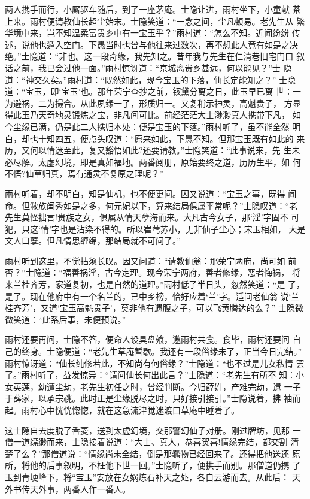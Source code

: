 两人携手而行，小厮驱车随后，到了一座茅庵。士隐让进，雨村坐下，小童献
茶上来。雨村便请教仙长超尘始末。士隐笑道：“一念之间，尘凡顿易。老先生从
繁华境中来，岂不知温柔富贵乡中有一宝玉乎？”雨村道：“怎么不知。近闻纷纷
传述，说他也遁入空门。下愚当时也曾与他往来过数次，再不想此人竟有如是之决
绝。”士隐道：“非也。这一段奇缘，我先知之。昔年我与先生在仁清巷旧宅门口
叙话之前，我已会过他一面。”雨村惊讶道：“京城离贵乡甚远，何以能见？”士
隐道：“神交久矣。”雨村道：“既然如此，现今宝玉的下落，仙长定能知之？”
士隐道：“宝玉，即‘宝玉’也。那年荣宁查抄之前，钗黛分离之日，此玉早已离
世：一为避祸，二为撮合。从此夙缘一了，形质归一。又复稍示神灵，高魁贵子，
方显得此玉乃天奇地灵锻炼之宝，非凡间可比。前经茫茫大士渺渺真人携带下凡，
如今尘缘已满，仍是此二人携归本处：便是宝玉的下落。”雨村听了，虽不能全然
明白，却也十知四五，便点头叹道：“原来如此，下愚不知。但那宝玉既有如此的
来历，又何以情迷至此，复又豁悟如此?还要请教。”士隐笑道：“此事说来，先
生未必尽解。太虚幻境，即是真如福地。两番阅册，原始要终之道，历历生平，如
何不悟?仙草归真，焉有通灵不复原之理呢？”

雨村听着，却不明白，知是仙机，也不便更问。因又说道：“宝玉之事，既得
闻命。但敝族闺秀如是之多，何元妃以下，算来结局俱属平常呢？”士隐叹道：“老
先生莫怪拙言!贵族之女，俱属从情天孽海而来。大凡古今女子，那‘淫’字固不
可犯，只这‘情’字也是沾染不得的。所以崔莺苏小，无非仙子尘心；宋玉相如，
大是文人口孽。但凡情思缠绵，那结局就不可问了。”

雨村听到这里，不觉拈须长叹。因又问道：“请教仙翁：那荣宁两府，尚可如
前否？”士隐道：“福善祸淫，古今定理。现今荣宁两府，善者修缘，恶者悔祸，
将来兰桂齐芳，家道复初，也是自然的道理。”雨村低了半日头，忽然笑道：“是
了，是了。现在他府中有一个名兰的，已中乡榜，恰好应着‘兰’字。适间老仙翁
说‘兰桂齐芳’，又道‘宝玉高魁贵子’，莫非他有遗腹之子，可以飞黄腾达的么？”
士隐微微笑道：“此系后事，未便预说。”

雨村还要再问，士隐不答，便命人设具盘飧，邀雨村共食。食毕，雨村还要问
自己的终身。士隐便道：“老先生草庵暂歇。我还有一段俗缘未了，正当今日完结。”
雨村惊讶道：“仙长纯修若此，不知尚有何俗缘？”士隐道：“也不过是儿女私情
罢了。”雨村听了，益发惊异：“请问仙长何出此言？”士隐道：“老先生有所不
知：小女英莲，幼遭尘劫，老先生初任之时，曾经判断。今归薛姓，产难完劫，遗
一子于薛家，以承宗祧。此时正是尘缘脱尽之时，只好接引接引。”士隐说着，拂
袖而起。雨村心中恍恍惚惚，就在这急流津觉迷渡口草庵中睡着了。

这士隐自去度脱了香菱，送到太虚幻境，交那警幻仙子对册。刚过牌坊，见那
一僧一道缥缈而来，士隐接着说道：“大士、真人，恭喜贺喜!情缘完结，都交割
清楚了么？”那僧道说：“情缘尚未全结，倒是那蠢物已经回来了。还得把他送还
原所，将他的后事叙明，不枉他下世一回。”士隐听了，便拱手而别。那僧道仍携
了玉到青埂峰下，将“宝玉”安放在女娲炼石补天之处，各自云游而去。从此后：
天外书传天外事，两番人作一番人。

